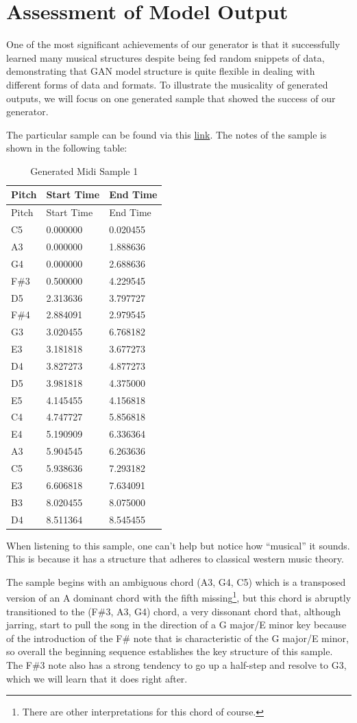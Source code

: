 \documentclass[12pt,oneside]{chicagocapstone}
\begin{document}
\hypertarget{findings-assess_model}{%
\section*{Assessment of Model Output}\label{findings-assess_model}}

One of the most significant achievements of our generator is that it successfully learned many musical structures despite being fed random snippets of data, demonstrating that GAN model structure is quite flexible in dealing with different forms of data and formats. To illustrate the musicality of generated outputs, we will focus on one generated sample that showed the success of our generator.

The particular sample can be found via this \href{https://github.com/terrywang15/museG_dev/blob/master/2020-01-31\%2002-20/ep_400.mid}{link}. The notes of the sample is shown in the following table:
\begin{longtable}[]{@{}lll@{}}
\caption{\label{tab:inher} Generated Midi Sample 1}\tabularnewline
\toprule
Pitch & Start Time & End Time\tabularnewline
\midrule
\endfirsthead
\toprule
Pitch & Start Time & End Time\tabularnewline
\midrule
\endhead
C5 & 0.000000 & 0.020455\tabularnewline
A3 & 0.000000 & 1.888636\tabularnewline
G4 & 0.000000 & 2.688636\tabularnewline
F\#3 & 0.500000 & 4.229545\tabularnewline
D5 & 2.313636 & 3.797727\tabularnewline
F\#4 & 2.884091 & 2.979545\tabularnewline
G3 & 3.020455 & 6.768182\tabularnewline
E3 & 3.181818 & 3.677273\tabularnewline
D4 & 3.827273 & 4.877273\tabularnewline
D5 & 3.981818 & 4.375000\tabularnewline
E5 & 4.145455 & 4.156818\tabularnewline
C4 & 4.747727 & 5.856818\tabularnewline
E4 & 5.190909 & 6.336364\tabularnewline
A3 & 5.904545 & 6.263636\tabularnewline
C5 & 5.938636 & 7.293182\tabularnewline
E3 & 6.606818 & 7.634091\tabularnewline
B3 & 8.020455 & 8.075000\tabularnewline
D4 & 8.511364 & 8.545455\tabularnewline
\bottomrule
\end{longtable}
When listening to this sample, one can't help but notice how ``musical'' it sounds. This is because it has a structure that adheres to classical western music theory.

The sample begins with an ambiguous chord (A3, G4, C5) which is a transposed version of an A dominant chord with the fifth missing\footnote{There are other interpretations for this chord of course.}, but this chord is abruptly transitioned to the (F\#3, A3, G4) chord, a very dissonant chord that, although jarring, start to pull the song in the direction of a G major/E minor key because of the introduction of the F\# note that is characteristic of the G major/E minor, so overall the beginning sequence establishes the key structure of this sample. The F\#3 note also has a strong tendency to go up a half-step and resolve to G3, which we will learn that it does right after.
\end{document}
